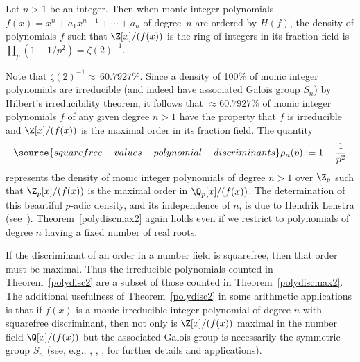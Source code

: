 \begin{theorem}
\notready\label{polydiscmax2}
  Let $n > 1$ be an integer.  Then when monic integer polynomials
  $f(x)=x^n+a_1x^{n-1}+\cdots+a_n$ of degree~$n$ are ordered by
  $H(f)$, the density of polynomials $f$ such that $\Z[x]/(f(x))$ is
  the ring of integers in its fraction field is
  $\prod_p(1-1/p^2)=\zeta(2)^{-1}$.
\end{theorem}
Note that $\zeta(2)^{-1}\approx\, 60.7927\%$.  Since a density of
100\% of monic integer polynomials are irreducible (and indeed have
associated Galois group $S_n$) by Hilbert's irreducibility theorem, it
follows that $\approx 60.7927\%$ of monic integer polynomials $f$ of
any given degree $n>1$ have the property that $f$ is irreducible and
$\Z[x]/(f(x))$ is the maximal order in its fraction field. The
quantity
\begin{equation}\label{eqrho}
\source{squarefree-values-polynomial-discriminants}
  \rho_n(p):=1-\frac{1}{p^2}
\end{equation}
represents the density of monic integer polynomials
of degree $n>1$ over $\Z_p$ such that $\Z_p[x]/(f(x))$ is the maximal
order in $\Q_p[x]/(f(x))$.  The determination of this beautiful
$p$-adic density, and its independence of $n$, is due to Hendrik
Lenstra (see~\cite[Proposition~3.5]{ABZ}).  Theorem~\ref{polydiscmax2}
again holds even if we restrict to polynomials of degree $n$ having a
fixed number of real roots.

If the discriminant of an order in a number field is squarefree, then
that order must be maximal.  Thus the irreducible polynomials counted
in Theorem~\ref{polydisc2} are a subset of those counted in
Theorem~\ref{polydiscmax2}.  The additional usefulness of
Theorem~\ref{polydisc2} in some arithmetic applications is that if
$f(x)$ is a monic irreducible integer polynomial of degree $n$ with
squarefree discriminant, then not only is $\Z[x]/(f(x))$ maximal in
the number field $\Q[x]/(f(x))$ but the associated Galois group is
necessarily the symmetric group $S_n$ (see, e.g., \cite{Scholz},
\cite{Yamamura}, \cite{Nakagawa}, \cite{Kondo} for further details and
applications).


